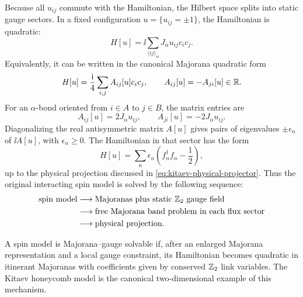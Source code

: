 Because all \(u_{ij}\) commute with the Hamiltonian, the Hilbert space splits
into static gauge sectors.  In a fixed configuration
\(u=\{u_{ij}=\pm1\}\), the Hamiltonian is quadratic:
\begin{equation}
\label{eq:kitaev-fixed-sector-hamiltonian}
    H[u]
    =
    \ii\sum_{\langle ij\rangle_\alpha}J_\alpha u_{ij}c_i c_j .
\end{equation}
Equivalently, it can be written in the canonical Majorana quadratic form
\begin{equation}
\label{eq:kitaev-majorana-quadratic-form}
    H[u]
    =
    \frac{\mathrm{i}}{4}\sum_{i,j}A_{ij}[u]c_i c_j,
    \qquad
    A_{ij}[u]=-A_{ji}[u]\in\mathbb{R} .
\end{equation}
For an \(\alpha\)-bond oriented from \(i\in A\) to \(j\in B\), the matrix entries
are
\begin{equation}
\label{eq:kitaev-a-matrix-entry}
    A_{ij}[u]=2J_\alpha u_{ij},
    \qquad
    A_{ji}[u]=-2J_\alpha u_{ij} .
\end{equation}
Diagonalizing the real antisymmetric matrix \(A[u]\) gives pairs of eigenvalues
\(\pm\epsilon_n\) of \(\ii A[u]\), with \(\epsilon_n\geq0\).  The Hamiltonian in
that sector has the form
\begin{equation}
\label{eq:kitaev-diagonal-majorana-spectrum}
    H[u]
    =
    \sum_{n}\epsilon_n\left(f_n^\dagger f_n-\frac{1}{2}\right),
\end{equation}
up to the physical projection discussed in \cref{eq:kitaev-physical-projector}.
Thus the original interacting spin model is solved by the following sequence:
\begin{align}
\label{eq:kitaev-solution-sequence}
    \text{spin model}
    &\longrightarrow
    \text{Majoranas plus static }\mathbb{Z}_2\text{ gauge field}
    \notag\\
    &\longrightarrow
    \text{free Majorana band problem in each flux sector}
    \notag\\
    &\longrightarrow
    \text{physical projection} .
\end{align}

\begin{principle}
A spin model is Majorana--gauge solvable if, after an enlarged Majorana
representation and a local gauge constraint, its Hamiltonian becomes quadratic in
itinerant Majoranas with coefficients given by conserved \(\mathbb{Z}_2\) link
variables.  The Kitaev honeycomb model is the canonical two-dimensional example
of this mechanism.
\end{principle}

